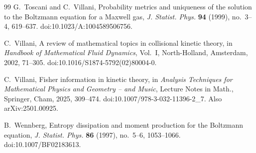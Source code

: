 \documentclass[11pt]{amsart}
\theoremstyle{definition}
\begin{document}
\begin{thebibliography}{99}
 G.~Toscani and C.~Villani, Probability metrics and uniqueness of the solution to the Boltzmann equation for a Maxwell gas, \emph{J. Statist. Phys.} \textbf{94} (1999), no.~3--4, 619--637. doi:10.1023/A:1004589506756.

 C.~Villani, A review of mathematical topics in collisional kinetic theory, in \emph{Handbook of Mathematical Fluid Dynamics}, Vol.~I, North-Holland, Amsterdam, 2002, 71--305. doi:10.1016/S1874-5792(02)80004-0.

 C.~Villani, Fisher information in kinetic theory, in \emph{Analysis Techniques for Mathematical Physics and Geometry -- and Music}, Lecture Notes in Math., Springer, Cham, 2025, 309--474. doi:10.1007/978-3-032-11396-2\_7. Also arXiv:2501.00925.

 B.~Wennberg, Entropy dissipation and moment production for the Boltzmann equation, \emph{J. Statist. Phys.} \textbf{86} (1997), no.~5--6, 1053--1066. doi:10.1007/BF02183613.

\end{thebibliography}
\end{document}
